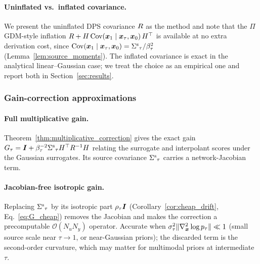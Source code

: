 \paragraph{Uninflated vs.\ inflated covariance.}
We present the uninflated DPS covariance $R$ as the method and note that the
$\Pi$GDM-style inflation
$R+H\,\text{Cov}(\boldsymbol{x}_1\mid\boldsymbol{x}_\tau,\boldsymbol{x}_0)\,H^\top$ is available
at no extra derivation cost, since $\text{Cov}(\boldsymbol{x}_1\mid\boldsymbol{x}_\tau,\boldsymbol{x}_0)={\Sigma^{\mathrm{s}}}_\tau/\beta_\tau^2$
(Lemma~\ref{lem:source_moments}). The inflated covariance is exact in the
analytical linear--Gaussian case; we treat the choice as an empirical one and
report both in Section~\ref{sec:results}.

\subsubsection{Gain-correction approximations}

\paragraph{Full multiplicative gain.}
Theorem~\ref{thm:multiplicative_correction} gives the exact gain
$G_\tau=\bm{I}+\beta_\tau^{-2}{\Sigma^{\mathrm{s}}}_\tau H^\top R^{-1}H$
relating the surrogate and interpolant scores under the Gaussian surrogates. Its
source covariance ${\Sigma^{\mathrm{s}}}_\tau$ carries a network-Jacobian term.

\paragraph{Jacobian-free isotropic gain.}
Replacing ${\Sigma^{\mathrm{s}}}_\tau$ by its isotropic part $\rho_\tau\bm{I}$
(Corollary~\ref{cor:cheap_drift}, Eq.~\eqref{eq:G_cheap}) removes the Jacobian and
makes the correction a precomputable $\mathcal{O}(N_uN_y)$ operator. Accurate when
$\sigma_\tau^2\|\nabla_{\boldsymbol{x}}^2\log p_\tau\|\ll1$ (small source scale near
$\tau\to1$, or near-Gaussian priors); the discarded term is the second-order
curvature, which may matter for multimodal priors at intermediate $\tau$.

